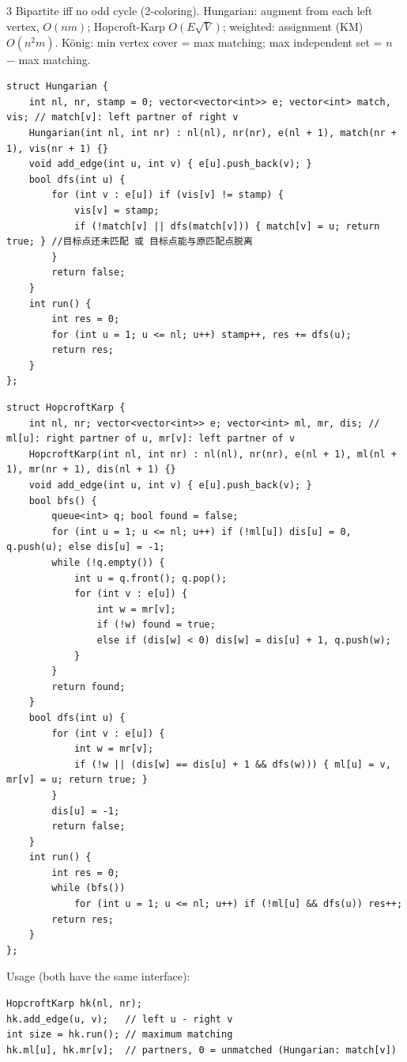 \documentclass[8pt]{extarticle}
\begin{document}
\begin{multicols*}{3}
Bipartite iff no odd cycle (2-coloring). Hungarian: augment from each left vertex, $O(nm)$; Hopcroft-Karp $O(E\sqrt V)$; weighted: assignment (KM) $O(n^2 m)$. König: min vertex cover = max matching; max independent set = $n$ $-$ max matching.

\begin{lstlisting}
struct Hungarian {
    int nl, nr, stamp = 0; vector<vector<int>> e; vector<int> match, vis; // match[v]: left partner of right v
    Hungarian(int nl, int nr) : nl(nl), nr(nr), e(nl + 1), match(nr + 1), vis(nr + 1) {}
    void add_edge(int u, int v) { e[u].push_back(v); }
    bool dfs(int u) {
        for (int v : e[u]) if (vis[v] != stamp) {
            vis[v] = stamp;
            if (!match[v] || dfs(match[v])) { match[v] = u; return true; } //目标点还未匹配 或 目标点能与原匹配点脱离
        }
        return false;
    }
    int run() {
        int res = 0;
        for (int u = 1; u <= nl; u++) stamp++, res += dfs(u);
        return res;
    }
};
\end{lstlisting}

\begin{lstlisting}
struct HopcroftKarp {
    int nl, nr; vector<vector<int>> e; vector<int> ml, mr, dis; // ml[u]: right partner of u, mr[v]: left partner of v
    HopcroftKarp(int nl, int nr) : nl(nl), nr(nr), e(nl + 1), ml(nl + 1), mr(nr + 1), dis(nl + 1) {}
    void add_edge(int u, int v) { e[u].push_back(v); }
    bool bfs() {
        queue<int> q; bool found = false;
        for (int u = 1; u <= nl; u++) if (!ml[u]) dis[u] = 0, q.push(u); else dis[u] = -1;
        while (!q.empty()) {
            int u = q.front(); q.pop();
            for (int v : e[u]) {
                int w = mr[v];
                if (!w) found = true;
                else if (dis[w] < 0) dis[w] = dis[u] + 1, q.push(w);
            }
        }
        return found;
    }
    bool dfs(int u) {
        for (int v : e[u]) {
            int w = mr[v];
            if (!w || (dis[w] == dis[u] + 1 && dfs(w))) { ml[u] = v, mr[v] = u; return true; }
        }
        dis[u] = -1;
        return false;
    }
    int run() {
        int res = 0;
        while (bfs())
            for (int u = 1; u <= nl; u++) if (!ml[u] && dfs(u)) res++;
        return res;
    }
};
\end{lstlisting}

Usage (both have the same interface):

\begin{lstlisting}
HopcroftKarp hk(nl, nr);
hk.add_edge(u, v);   // left u - right v
int size = hk.run(); // maximum matching
hk.ml[u], hk.mr[v];  // partners, 0 = unmatched (Hungarian: match[v])
\end{lstlisting}


\end{multicols*}
\end{document}
